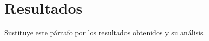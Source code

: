\chapter{Resultados}\label{cap:resultados}

Sustituye este párrafo por los resultados obtenidos y su análisis.
